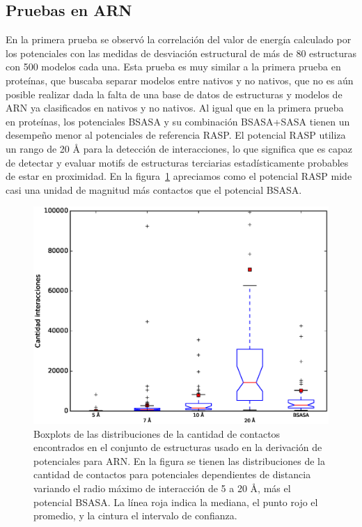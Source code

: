 \subsection{Pruebas en ARN}
En la primera prueba se observó la correlación del valor de energía calculado por los potenciales con las medidas de desviación estructural de más de 80 estructuras con 500 modelos cada una.
Esta prueba es muy similar a la primera prueba en proteínas, que buscaba separar modelos entre nativos y no nativos, que no es aún posible realizar dada la falta de una base de datos de estructuras y modelos de ARN ya clasificados en nativos y no nativos.
Al igual que en la primera prueba en proteínas, los potenciales BSASA y su combinación BSASA+SASA tienen un desempeño menor al potenciales de referencia RASP.
El potencial RASP utiliza un rango de 20 \si{\angstrom} para la detección de interacciones, lo que significa que es capaz de detectar y evaluar motifs de estructuras terciarias estadísticamente probables de estar en proximidad.
En la figura~\ref{fig:radii_rna} apreciamos como el potencial RASP mide casi una unidad de magnitud más contactos que el potencial BSASA.
\begin{figure}[!p]
\centering
\includegraphics[width=\linewidth]{figures/radii_rna.eps}
\caption[Boxplots de las distribuciones de la cantidad de contactos encontrados en el conjunto de estructuras usado en la derivación de potenciales para ARN.]{Boxplots de las distribuciones de la cantidad de contactos encontrados en el conjunto de estructuras usado en la derivación de potenciales para ARN. En la figura se tienen las distribuciones de la cantidad de contactos para potenciales dependientes de distancia variando el radio máximo de interacción de 5 a 20 \si{\angstrom}, más el potencial BSASA. La línea roja indica la mediana, el punto rojo el promedio, y la cintura el intervalo de confianza.}
\label{fig:radii_rna}
\end{figure}
